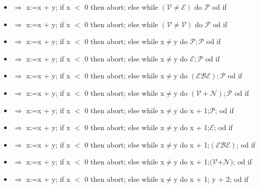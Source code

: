 \begin{itemize}
\item $\Rightarrow $ x:=x + y; if x $<$ 0 then abort; else while $(\mathcal{V%
}\neq \mathcal{E})$ do $\mathcal{P}$ od if

\item $\Rightarrow $ x:=x + y; if x $<$ 0 then abort; else while $(\mathcal{V%
}\neq \mathcal{V})$ do $\mathcal{P}$ od if

\item $\Rightarrow $ x:=x + y; if x $<$ 0 then abort; else while x$\neq $y
do $\mathcal{P};\mathcal{P}$ od if

\item $\Rightarrow $ x:=x + y; if x $<$ 0 then abort; else while x$\neq $y
do $\mathcal{E};\mathcal{P}$ od if

\item $\Rightarrow $ x:=x + y; if x $<$ 0 then abort; else while x$\neq $y
do $(\mathcal{E}\mathcal{B}\mathcal{E});\mathcal{P}$ od if

\item $\Rightarrow $ x:=x + y; if x $<$ 0 then abort; else while x$\neq $y
do $(\mathcal{V}+\mathcal{N});\mathcal{P}$ od if

\item $\Rightarrow $ x:=x + y; if x $<$ 0 then abort; else while x$\neq $y
do x + 1;$\mathcal{P}$; od if

\item $\Rightarrow $ x:=x + y; if x $<$ 0 then abort; else while x$\neq $y
do x + 1;$\mathcal{E}$; od if

\item $\Rightarrow $ x:=x + y; if x $<$ 0 then abort; else while x$\neq $y
do x + 1;$(\mathcal{E}\mathcal{B}\mathcal{E})$; od if

\item $\Rightarrow$ x:=x + y; if x $<$ 0 then abort; else while x$\neq $y do
x + 1;$(\mathcal{V} $+$\mathcal{N})$; od if

\item $\Rightarrow$ x:=x + y; if x $<$ 0 then abort; else while x$\neq $y do
x + 1; y + 2; od if
\end{itemize}
